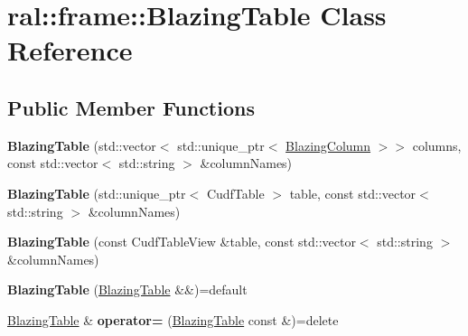 \hypertarget{classral_1_1frame_1_1BlazingTable}{}\section{ral\+:\+:frame\+:\+:Blazing\+Table Class Reference}
\label{classral_1_1frame_1_1BlazingTable}
\subsection*{Public Member Functions}
\begin{DoxyCompactItemize}
\item 
\mbox{\label{classral_1_1frame_1_1BlazingTable_a7dbf7616b0bf068688b59031e6704408}} 
{\bfseries Blazing\+Table} (std\+::vector$<$ std\+::unique\+\_\+ptr$<$ \hyperlink{classral_1_1frame_1_1BlazingColumn}{Blazing\+Column} $>$$>$ columns, const std\+::vector$<$ std\+::string $>$ \&column\+Names)
\item 
\mbox{\label{classral_1_1frame_1_1BlazingTable_a77d0dda2ad02f3c2a6aacfb84e06a4a6}} 
{\bfseries Blazing\+Table} (std\+::unique\+\_\+ptr$<$ Cudf\+Table $>$ table, const std\+::vector$<$ std\+::string $>$ \&column\+Names)
\item 
\mbox{\label{classral_1_1frame_1_1BlazingTable_ac6af86b8968e2f56a7bcb39c35fcd589}} 
{\bfseries Blazing\+Table} (const Cudf\+Table\+View \&table, const std\+::vector$<$ std\+::string $>$ \&column\+Names)
\item 
\mbox{\label{classral_1_1frame_1_1BlazingTable_a1fe4f1d3a9d95e8eba30dd723d318eb3}} 
{\bfseries Blazing\+Table} (\hyperlink{classral_1_1frame_1_1BlazingTable}{Blazing\+Table} \&\&)=default
\item 
\mbox{\label{classral_1_1frame_1_1BlazingTable_a4dc7d75cc8598f067267a9ab9bfdccb9}} 
\hyperlink{classral_1_1frame_1_1BlazingTable}{Blazing\+Table} \& {\bfseries operator=} (\hyperlink{classral_1_1frame_1_1BlazingTable}{Blazing\+Table} const \&)=delete
\item 
\mbox{\label{classral_1_1frame_1_1BlazingTable_af103b98ebd31e68f7b68e39c3a7e9dd2}} 
$$
\end{DoxyCompactItemize}
